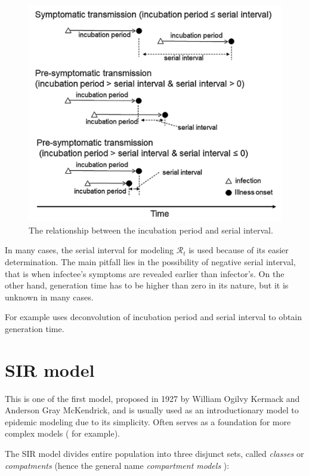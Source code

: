 \documentclass[
  digital, %
  oneside, %
  lof,     %
  lot,     %
]{fithesis4}
\begin{document}
\begin{figure}[h]
  \includegraphics[width=\textwidth]{images/nishiura2020_terms.png}
  \caption{The relationship between the incubation period and serial interval. \cite{nishiura2020}}
  \label{fig:nishiura-transmission}
\end{figure}

In many cases, the serial interval for modeling $\mathcal{R}_t$ 
is used because of its easier determination. 
The main pitfall lies in the possibility of negative serial 
interval, that is when infectee's symptoms are revealed 
earlier than infector's. 
On the other hand, generation time has to be higher than 
zero in its nature, but it is unknown in many cases. 

For example \cite{knight2020} uses deconvolution of incubation 
period and serial interval to obtain generation time.



\section{SIR model}

This is one of the first model, proposed in 1927 by 
William Ogilvy Kermack and Anderson Gray McKendrick, and is 
usually used as an introductionary model to epidemic 
modeling \cite{martcheva2015} due to its simplicity. 
Often serves as a foundation for more complex 
models (\cite{clancy2008} for example).

The SIR model divides entire population into three disjunct 
sets, called \textit{classes} or \textit{compatments} (hence the general 
name \textit{compartment models} \cite{bacaer2011}):
\end{document}
